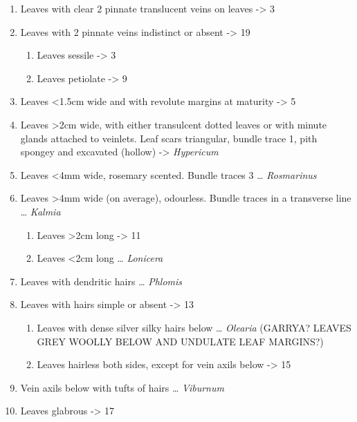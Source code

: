 \documentclass[openany]{book}
\providecommand{\tightlist}{%
  \setlength{\itemsep}{0pt}\setlength{\parskip}{0pt}}
\begin{document}
\begin{enumerate}
\def\labelenumi{\arabic{enumi}.}
\tightlist
\item
  Leaves with clear 2 pinnate translucent veins on leaves -\textgreater{} 3
\item
  Leaves with 2 pinnate veins indistinct or absent -\textgreater{} 19

  \begin{enumerate}
  \def\labelenumii{\arabic{enumii}.}
  \setcounter{enumii}{2}
  \tightlist
  \item
    Leaves sessile -\textgreater{} 3
  \item
    Leaves petiolate -\textgreater{} 9
  \end{enumerate}
\item
  Leaves \textless{}1.5cm wide and with revolute margins at maturity -\textgreater{} 5
\item
  Leaves \textgreater{}2cm wide, with either transulcent dotted leaves or with minute glands attached to veinlets.
  Leaf scars triangular, bundle trace 1, pith spongey and excavated (hollow) -\textgreater{} \emph{Hypericum}
\item
  Leaves \textless{}4mm wide, rosemary scented. Bundle traces 3 \ldots{} \emph{Rosmarinus}
\item
  Leaves \textgreater{}4mm wide (on average), odourless. Bundle traces in a transverse line \ldots{} \emph{Kalmia}

  \begin{enumerate}
  \def\labelenumii{\arabic{enumii}.}
  \setcounter{enumii}{8}
  \tightlist
  \item
    Leaves \textgreater{}2cm long -\textgreater{} 11
  \item
    Leaves \textless{}2cm long \ldots{} \emph{Lonicera}
  \end{enumerate}
\item
  Leaves with dendritic hairs \ldots{} \emph{Phlomis}
\item
  Leaves with hairs simple or absent -\textgreater{} 13

  \begin{enumerate}
  \def\labelenumii{\arabic{enumii}.}
  \setcounter{enumii}{12}
  \tightlist
  \item
    Leaves with dense silver silky hairs below \ldots{} \emph{Olearia} (GARRYA? LEAVES GREY WOOLLY BELOW AND UNDULATE LEAF MARGINS?)
  \item
    Leaves hairless both sides, except for vein axils below -\textgreater{} 15
  \end{enumerate}
\item
  Vein axils below with tufts of hairs \ldots{} \emph{Viburnum}
\item
  Leaves glabrous -\textgreater{} 17


\end{enumerate}
\end{document}
